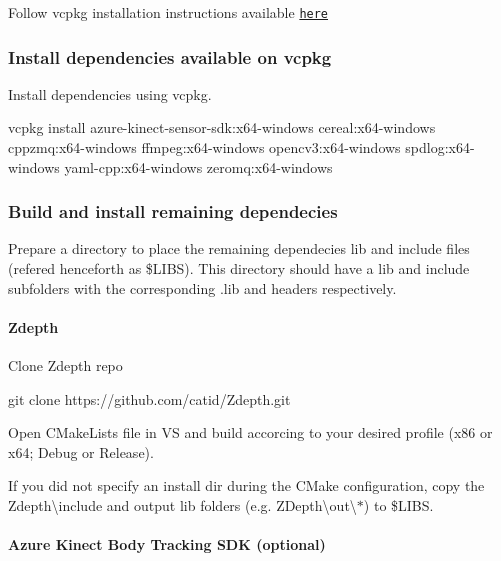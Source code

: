 Follow vcpkg installation instructions available \href{https://docs.microsoft.com/en-us/cpp/build/install-vcpkg?view=msvc-160&tabs=windows}{\tt here}

\subsubsection*{Install dependencies available on vcpkg}

Install dependencies using vcpkg.


\begin{DoxyCode}
vcpkg install azure-kinect-sensor-sdk:x64-windows cereal:x64-windows cppzmq:x64-windows ffmpeg:x64-windows
       opencv3:x64-windows spdlog:x64-windows yaml-cpp:x64-windows zeromq:x64-windows
\end{DoxyCode}


\subsubsection*{Build and install remaining dependecies}

Prepare a directory to place the remaining dependecies lib and include files (refered henceforth as {\ttfamily \$\+L\+I\+BS}). This directory should have a {\ttfamily lib} and {\ttfamily include} subfolders with the corresponding {\ttfamily .lib} and headers respectively.

\paragraph*{Zdepth}

Clone Zdepth repo


\begin{DoxyCode}
git clone https://github.com/catid/Zdepth.git
\end{DoxyCode}


Open C\+Make\+Lists file in VS and build accorcing to your desired profile (x86 or x64; Debug or Release).

If you did not specify an install dir during the C\+Make configuration, copy the {\ttfamily Zdepth\textbackslash{}include} and output lib folders (e.\+g. {\ttfamily Z\+Depth\textbackslash{}out\textbackslash{}$\ast$}) to {\ttfamily \$\+L\+I\+BS}.

\paragraph*{Azure Kinect Body Tracking S\+DK (optional)}

